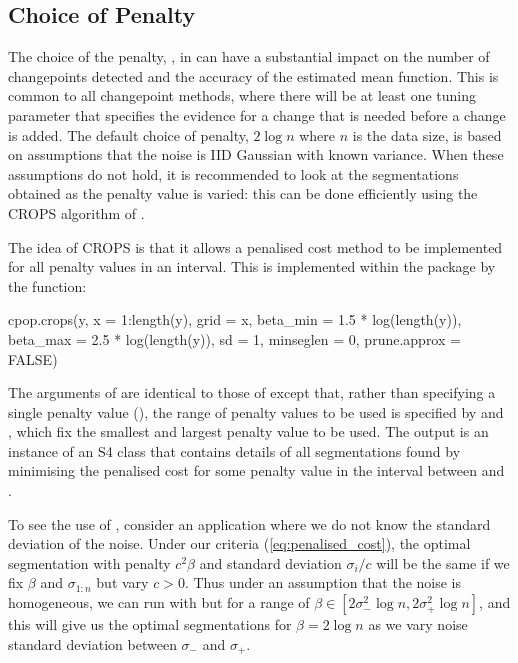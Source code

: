 \documentclass[nojss]{jss}
\begin{document}
\subsection{Choice of Penalty}

The choice of the penalty, , in  can have a substantial impact on the number of changepoints detected and the accuracy of the estimated mean function. This is common to all changepoint methods, where there will be at least one tuning parameter that specifies the evidence for a change that is needed before a change is added. The default choice of penalty, $2\log n$ where $n$ is the data size, is based on assumptions that the noise is IID Gaussian with known variance. When these assumptions do not hold, it is recommended to look at the segmentations obtained as the penalty value is varied: this can be done efficiently using the CROPS algorithm of \cite{haynes2017computationally}. 

The idea of CROPS is that it allows a penalised cost method to be implemented for all penalty values in an interval. This is implemented within the  package by the function:
\begin{CodeInput}
cpop.crops(y, x = 1:length(y), grid = x, beta_min = 1.5 * log(length(y)),
  beta_max = 2.5 * log(length(y)), sd = 1, minseglen = 0, prune.approx = FALSE)
\end{CodeInput}
The arguments of  are identical to those of  except that, rather than specifying a single penalty value (), the range of penalty values to be used is specified by  and , which fix the smallest and largest penalty value to be used. The output is an instance of an S4 class that contains details of all segmentations found by minimising the penalised cost for some penalty value in the interval between  and .

To see the use of , consider an application where we do not know the standard deviation of the noise. Under our criteria (\ref{eq:penalised_cost}), the optimal segmentation with penalty $c^2 \beta$ and standard deviation $\sigma_i/c$ will be the same if we fix $\beta$ and $\sigma_{1:n}$ but vary $c>0$. Thus under an assumption that the noise is homogeneous, we can run  with  but for a range of $\beta \in [2\sigma_{-}^2\log n,2\sigma_{+}^2\log n]$, and this will give us the optimal segmentations for $\beta=2 \log n$ as we vary noise standard deviation between $\sigma_{-}$ and $\sigma_{+}$.
\end{document}
